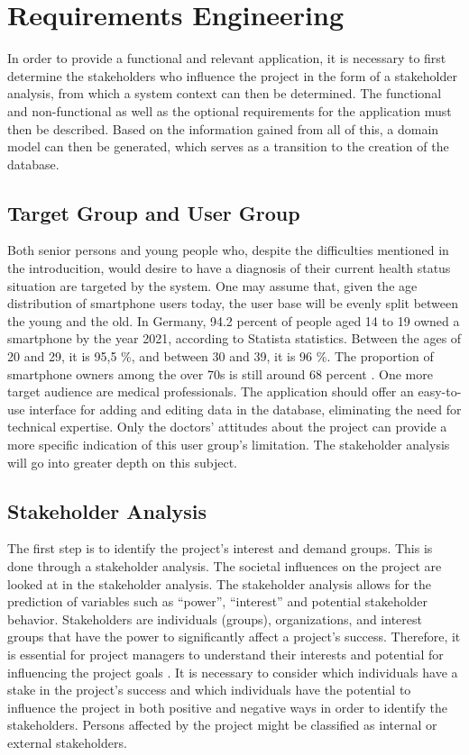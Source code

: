 
\chapter{Requirements Engineering}
In order to provide a functional and relevant application, it is necessary to first determine the stakeholders who influence the project in the form of a stakeholder analysis, from which a system context can then be determined. The functional and non-functional as well as the optional requirements for the application must then be described. Based on the information gained from all of this, a domain model can then be generated, which serves as a transition to the creation of the database.

\section{Target Group and User Group}
Both senior persons and young people who, despite the difficulties mentioned in the introducition, would desire to have a diagnosis of their current health status situation are targeted by the system. One may assume that, given the age distribution of smartphone users today, the user base will be evenly split between the young and the old. In Germany, 94.2 percent of people aged 14 to 19 owned a smartphone by the year 2021, according to Statista statistics. Between the ages of 20 and 29, it is 95,5 \%, and between 30 and 39, it is 96 \%. The proportion of smartphone owners among the over 70s is still around 68 percent \cite{.smartphonenutzer}.
One more target audience are medical professionals. The application should offer an easy-to-use interface for adding and editing data in the database, eliminating the need for technical expertise. Only the doctors' attitudes about the project can provide a more specific indication of this user group's limitation. The stakeholder analysis will go into greater depth on this subject. 

\section{Stakeholder Analysis}
The first step is to identify the project's interest and demand groups. This is done through a stakeholder analysis. The societal influences on the project are looked at in the stakeholder analysis. The stakeholder analysis allows for the prediction of variables such as “power”, “interest” and potential stakeholder behavior. Stakeholders are individuals (groups), organizations, and interest groups that have the power to significantly affect a project's success. Therefore, it is essential for project managers to understand their interests and potential for influencing the project goals \cite[p. 28]{.stakeholder}. It is necessary to consider which individuals have a stake in the project's success and which individuals have the potential to influence the project in both positive and negative ways in order to identify the stakeholders. Persons affected by the project might be classified as internal or external stakeholders. 

